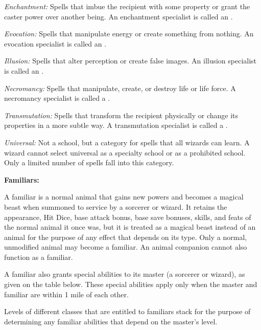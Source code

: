 \textit{Enchantment:} Spells that imbue the recipient with some property or grant the caster power over another being. An enchantment specialist is called an .

\textit{Evocation:} Spells that manipulate energy or create something from nothing. An evocation specialist is called an .

\textit{Illusion:} Spells that alter perception or create false images. An illusion specialist is called an .

\textit{Necromancy:} Spells that manipulate, create, or destroy life or life force. A necromancy specialist is called a .

\textit{Transmutation:} Spells that transform the recipient physically or change its properties in a more subtle way. A transmutation specialist is called a .

\textit{Universal:} Not a school, but a category for spells that all wizards can learn. A wizard cannot select universal as a specialty school or as a prohibited school. Only a limited number of spells fall into this category.

\textbf{Familiars:}

A familiar is a normal animal that gains new powers and becomes a magical beast when summoned to service by a sorcerer or wizard. It retains the appearance, Hit Dice, base attack bonus, base save bonuses, skills, and feats of the normal animal it once was, but it is treated as a magical beast instead of an animal for the purpose of any effect that depends on its type. Only a normal, unmodified animal may become a familiar. An animal companion cannot also function as a familiar.

A familiar also grants special abilities to its master (a sorcerer or wizard), as given on the table below. These special abilities apply only when the master and familiar are within 1 mile of each other.

Levels of different classes that are entitled to familiars stack for the purpose of determining any familiar abilities that depend on the master's level.

